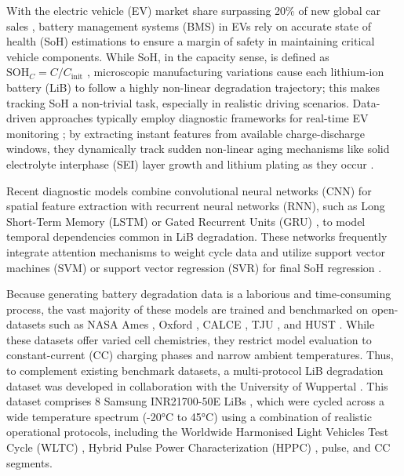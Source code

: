 \documentclass[conference]{IEEEtran}
\begin{document}
With the electric vehicle (EV) market share surpassing 20\% of new global car sales \cite{iea_ev_outlook_2024}, battery management systems (BMS) in EVs rely on accurate state of health (SoH) estimations to ensure a margin of safety in maintaining critical vehicle components.
While SoH, in the capacity sense, is defined as $\mathrm{SOH}_C = C / C_{\mathrm{init}}$ \cite{birkl2017degradation}, microscopic manufacturing variations cause each lithium-ion battery (LiB) to follow a highly non-linear degradation trajectory; this makes tracking SoH a non-trivial task, especially in realistic driving scenarios.
Data-driven approaches typically employ diagnostic frameworks for real-time EV monitoring \cite{hu2020battery, lipu2023data}; by extracting instant features from available charge-discharge windows, they dynamically track sudden non-linear aging mechanisms like solid electrolyte interphase (SEI) layer growth and lithium plating as they occur \cite{okane2022degradation}.

Recent diagnostic models combine convolutional neural networks (CNN) for spatial feature extraction with recurrent neural networks (RNN), such as Long Short-Term Memory (LSTM) \cite{li2025anode, chen2023cnnlstm} or Gated Recurrent Units (GRU) \cite{xia2023bigru, chen2023skdan}, to model temporal dependencies common in LiB degradation.
These networks frequently integrate attention mechanisms to weight cycle data \cite{wei2023dualattn, chen2023skdan} and utilize support vector machines (SVM) or support vector regression (SVR) for final SoH regression \cite{zhang2025woavmd, li2025issasvr}.

Because generating battery degradation data is a laborious and time-consuming process, the vast majority of these models are trained and benchmarked on open-datasets such as NASA Ames \cite{saha2007battery}, Oxford \cite{birkl2017oxford}, CALCE \cite{pecht2011calce}, TJU \cite{wang2024tju}, and HUST \cite{li2021hust}.
While these datasets offer varied cell chemistries, they restrict model evaluation to constant-current (CC) charging phases and narrow ambient temperatures.
Thus, to complement existing benchmark datasets, a multi-protocol LiB degradation dataset was developed in collaboration with the University of Wuppertal \cite{uni_wuppertal_ees}.
This dataset comprises 8 Samsung INR21700-50E LiBs \cite{samsung_50e_spec}, which were cycled across a wide temperature spectrum (-20°C to 45°C) using a combination of realistic operational protocols, including the Worldwide Harmonised Light Vehicles Test Cycle (WLTC) \cite{wltc_unece}, Hybrid Pulse Power Characterization (HPPC) \cite{hppc_usabc}, pulse, and CC segments.
\end{document}

